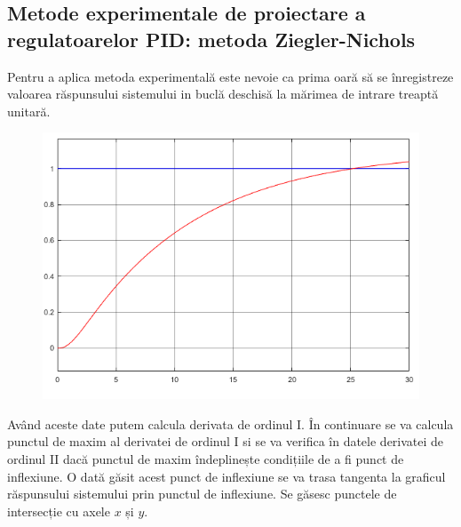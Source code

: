 \documentclass[11pt]{article}
\begin{document}
\subsection{Metode experimentale de proiectare a regulatoarelor PID: metoda Ziegler-Nichols}
Pentru a aplica metoda experimentală este nevoie ca prima oară să se înregistreze valoarea răspunsului sistemului in buclă deschisă la mărimea de intrare treaptă unitară.\\
\begin{figure}[H]
	\centering
	\includegraphics[width=.35\linewidth]{zn_desc.png}
	\label{fig:test2}
\end{figure}
Având aceste date putem calcula derivata de ordinul I. În continuare se va calcula punctul de maxim al derivatei de ordinul I si se va verifica în datele derivatei de ordinul II dacă punctul de maxim îndeplinește condițiile de a fi punct de inflexiune.
O dată găsit acest punct de inflexiune se va trasa tangenta la graficul răspunsului sistemului prin punctul de inflexiune. Se găsesc punctele de intersecție cu axele $x$ și $y$. \\
\end{document}
